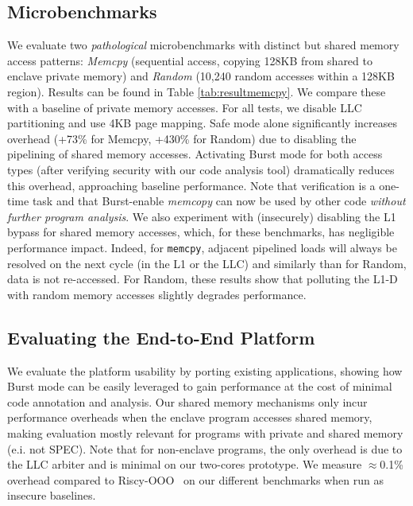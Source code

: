 \subsection{Microbenchmarks}
\label{sec:evalsharedmemory}

We evaluate two \emph{pathological} microbenchmarks with distinct but shared memory access patterns: \emph{Memcpy} (sequential access, copying 128KB from shared to enclave private memory) and \emph{Random} (10,240 random accesses within a 128KB region).
Results can be found in Table \ref{tab:resultmemcpy}.
We compare these with a baseline of private memory accesses.
For all tests, we disable LLC partitioning and use 4KB page mapping.
Safe mode alone significantly increases overhead (+73\% for Memcpy, +430\% for Random) due to disabling the pipelining of shared memory accesses. 
Activating Burst mode for both access types (after verifying security with our code analysis tool) dramatically reduces this overhead, approaching baseline performance.
Note that verification is a one-time task and that Burst-enable \emph{memcopy} can now be used by other code \emph{without further program analysis}.
We also experiment with (insecurely) disabling the L1 bypass for shared memory accesses, which, for these benchmarks, has negligible performance impact. 
Indeed, for \texttt{memcpy}, adjacent pipelined loads will always be resolved on the next cycle (in the L1 or the LLC) and similarly than for Random, data is not re-accessed.
For Random, these results show that polluting the L1-D with random memory accesses slightly degrades performance.

\subsection{Evaluating the End-to-End Platform}

We evaluate the platform usability by porting existing applications, showing how Burst mode can be easily leveraged to gain performance at the cost of minimal code annotation and analysis.
Our shared memory mechanisms only incur performance overheads when the enclave program accesses shared memory, making evaluation mostly relevant for programs with private and shared memory (e.i. not SPEC).
Note that for non-enclave programs, the only overhead is due to the LLC arbiter and is minimal on our two-cores prototype. We measure $\approx$0.1\% overhead compared to Riscy-OOO~\cite{zhang2018composable} on our different benchmarks when run as insecure baselines. 
\\


